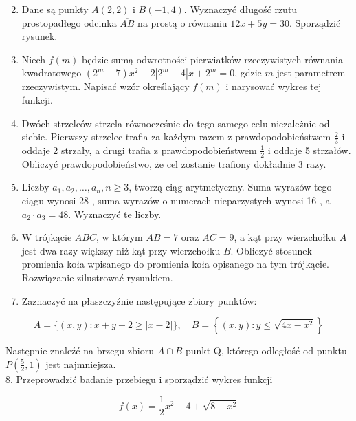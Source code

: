 \documentclass[10pt]{article}
\begin{document}
\begin{enumerate}
  \setcounter{enumi}{1}
  \item Dane są punkty $A(2,2)$ i $B(-1,4)$. Wyznaczyć długość rzutu prostopadłego odcinka $\overline{A B}$ na prostą o równaniu $12 x+5 y=30$. Sporządzić rysunek.
  \item Niech $f(m)$ będzie sumą odwrotności pierwiatków rzeczywistych równania kwadratowego $\left(2^{m}-7\right) x^{2}-2\left|2^{m}-4\right| x+2^{m}=0$, gdzie $m$ jest parametrem rzeczywistym. Napisać wzór określający $f(m)$ i narysować wykres tej funkcji.
  \item Dwóch strzelców strzela równocześnie do tego samego celu niezależnie od siebie. Pierwszy strzelec trafia za każdym razem z prawdopodobieństwem $\frac{2}{3}$ i oddaje 2 strzały, a drugi trafia z prawdopodobieństwem $\frac{1}{2}$ i oddaje 5 strzałów. Obliczyć prawdopodobieństwo, że cel zostanie trafiony dokładnie 3 razy.
  \item Liczby $a_{1}, a_{2}, \ldots, a_{n}, n \geqslant 3$, tworzą ciąg arytmetyczny. Suma wyrazów tego ciągu wynosi 28 , suma wyrazów o numerach nieparzystych wynosi 16 , a $a_{2} \cdot a_{3}=48$. Wyznaczyć te liczby.
  \item W trójkącie $A B C$, w którym $A B=7$ oraz $A C=9$, a kąt przy wierzchołku $A$ jest dwa razy większy niż kąt przy wierzchołku $B$. Obliczyć stosunek promienia koła wpisanego do promienia koła opisanego na tym trójkącie. Rozwiązanie zilustrować rysunkiem.
  \item Zaznaczyć na płaszczyźnie następujące zbiory punktów:
\end{enumerate}

$$
A=\{(x, y): x+y-2 \geqslant|x-2|\}, \quad B=\left\{(x, y): y \leqslant \sqrt{4 x-x^{2}}\right\}
$$

Następnie znaleźć na brzegu zbioru $A \cap B$ punkt Q, którego odległość od punktu $P\left(\frac{5}{2}, 1\right)$ jest najmniejsza.\\
8. Przeprowadzić badanie przebiegu i sporządzić wykres funkcji

$$
f(x)=\frac{1}{2} x^{2}-4+\sqrt{8-x^{2}}
$$
\end{document}
